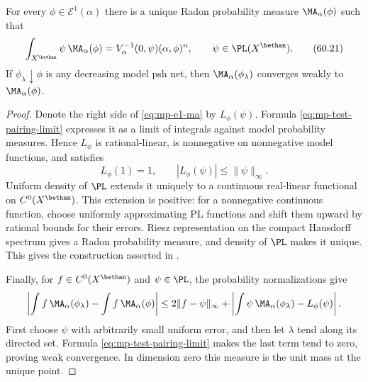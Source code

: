 \begin{samepage}
\begin{proposition}\label{prop:mp-e1-ma-existence}
For every $\phi\in\mathcal E^1(\alpha)$ there is a unique Radon probability measure $\MA_\alpha(\phi)$ such that
\[
 \int_{X^{\bethan}}\psi\,\MA_\alpha(\phi)
   =V_\alpha^{-1}(0,\psi)(\alpha,\phi)^n,
 \qquad\psi\in\PL(X^{\bethan}).
\tag{60.21}\label{eq:mp-e1-ma}
\]
If $\phi_\lambda\downarrow\phi$ is any decreasing model psh net, then $\MA_\alpha(\phi_\lambda)$ converges weakly to $\MA_\alpha(\phi)$.
\end{proposition}
\end{samepage}

\begin{proof}
Denote the right side of \eqref{eq:mp-e1-ma} by $L_\phi(\psi)$. Formula \eqref{eq:mp-test-pairing-limit} expresses it as a limit of integrals against model probability measures. Hence $L_\phi$ is rational-linear, is nonnegative on nonnegative model functions, and satisfies
\[
       L_\phi(1)=1,\qquad |L_\phi(\psi)|\leq\|\psi\|_\infty.
\]
Uniform density of $\PL$ extends it uniquely to a continuous real-linear functional on $C^0(X^{\bethan})$. This extension is positive: for a nonnegative continuous function, choose uniformly approximating PL functions and shift them upward by rational bounds for their errors. Riesz representation on the compact Hausdorff spectrum gives a Radon probability measure, and density of $\PL$ makes it unique. This gives the construction asserted in \cite[Remark~4.4.8, p.~43]{MPTropicalV2}.

Finally, for $f\in C^0(X^{\bethan})$ and $\psi\in\PL$, the probability normalizations give
\[
 \left|\int f\,\MA_\alpha(\phi_\lambda)-\int f\,\MA_\alpha(\phi)\right|
 \leq2\|f-\psi\|_\infty
       +\left|\int\psi\,\MA_\alpha(\phi_\lambda)-L_\phi(\psi)\right|.
\]
First choose $\psi$ with arbitrarily small uniform error, and then let $\lambda$ tend along its directed set. Formula \eqref{eq:mp-test-pairing-limit} makes the last term tend to zero, proving weak convergence. In dimension zero this measure is the unit mass at the unique point.
\end{proof}

